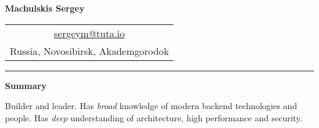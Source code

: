 \documentclass[final]{letter}
\begin{document}
\begin{center}

{\fontsize{25}{40}\selectfont\bf{Machulskis Sergey}}
  {\hfill
    \begin{tabular}{c}
        \href{mailto:sergeym@tuta.io}{sergeym@tuta.io}\\
        Russia, Novosibirsk, Akademgorodok
     \end{tabular}
  }
\rule{.98\textwidth}{1pt}

\addvspace{.1cm}

\end{center}
{\bf Summary}

Builder and leader. Has \textit{broad} knowledge of modern backend technologies and people. Has \textit{deep} understanding of architecture, high performance and security.
\end{document}
